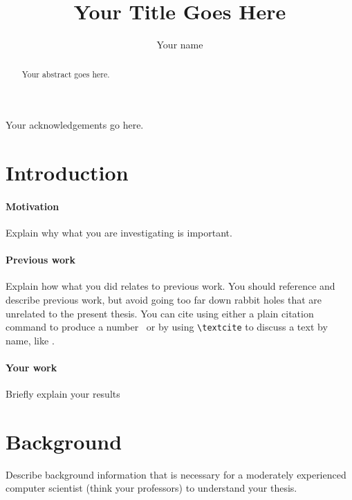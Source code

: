 \documentclass[midd]{thesis}
\title {Your Title Goes Here}
\author {Your name}
\begin{document}
\maketitle
{}
 
\begin{abstract} 
Your abstract goes here. 
\end{abstract}

\begin{acknowledgements}
Your acknowledgements go here. 

\end{acknowledgements}

\contentspage
\tablelistpage   %
\figurelistpage



\normalspacing \setcounter{page}{1} 

\chapter{Introduction}
\label{sec:intro}

\subsubsection{Motivation}
Explain why what you are investigating is important.

\subsubsection{Previous work}
Explain how what you did relates to previous work. You should reference and describe previous work, but avoid going too far down rabbit holes that are unrelated to the present thesis. You can cite using either a plain citation command to produce a number~\cite{aiw} or by using \texttt{\textbackslash textcite} to discuss a text by name, like \textcite{aiw}. 



\subsubsection{Your work}
Briefly explain your results

\chapter{Background}
\label{sec:background}

Describe background information that is necessary for a moderately experienced computer scientist (think your professors) to understand your thesis.
\end{document}

